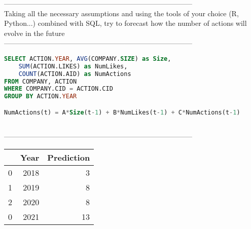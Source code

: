 --------------------------------------------------------------------------------
\\Taking all the necessary assumptions and using the tools of your choice (R, Python...) combined with SQL, try to forecast how the number of actions will evolve in the future\\
--------------------------------------------------------------------------------
\begin{lstlisting}[language = SQL]
SELECT ACTION.YEAR, AVG(COMPANY.SIZE) as Size,
    SUM(ACTION.LIKES) as NumLikes,
    COUNT(ACTION.AID) as NumActions
FROM COMPANY, ACTION
WHERE COMPANY.CID = ACTION.CID
GROUP BY ACTION.YEAR

NumActions(t) = A*Size(t-1) + B*NumLikes(t-1) + C*NumActions(t-1)
        
\end{lstlisting}
--------------------------------------------------------------------------------
\\\begin{tabular}{rrr}
\toprule
    &   Year &   Prediction \\
\midrule
  0 &   2018 &            3 \\
  1 &   2019 &            8 \\
  2 &   2020 &            8 \\
  0 &   2021 &           13 \\
\bottomrule
\end{tabular}
